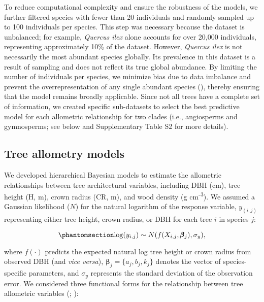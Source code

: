 \documentclass[
  12pt,
  letterpaper,
  DIV=11,
  numbers=noendperiod]{scrartcl}
\begin{document}
To reduce computational complexity and ensure the robustness of the
models, we further filtered species with fewer than 20 individuals and
randomly sampled up to 100 individuals per species. This step was
necessary because the dataset is unbalanced; for example, \emph{Quercus
ilex} alone accounts for over 20,000 individuals, representing
approximately 10\% of the dataset. However, \emph{Quercus ilex} is not
necessarily the most abundant species globally. Its prevalence in this
dataset is a result of sampling and does not reflect its true global
abundance. By limiting the number of individuals per species, we
minimize bias due to data imbalance and prevent the overrepresentation
of any single abundant species (), thereby ensuring that the model remains broadly applicable.
Since not all trees have a complete set of information, we created
specific sub-datasets to select the best predictive model for each
allometric relationship for two clades (i.e., angiosperms and
gymnosperms; see below and Supplementary Table S2 for more details).

\subsection{Tree allometry models}\label{tree-allometry-models}

We developed hierarchical Bayesian models to estimate the allometric
relationships between tree architectural variables, including DBH (cm),
tree height (H, m), crown radius (CR, m), and wood density (g
cm\textsuperscript{-3}). We assumed a Gaussian likelihood (\(N\)) for
the natural logarithm of the response variable, \(y_{(i,j)}\)
representing either tree height, crown radius, or DBH for each tree
\(i\) in species \(j\):

\begin{equation}\phantomsection\label{eq-like}{
\log(y_{i,j}) \sim N(f(X_{i,j}, \pmb{\beta}_{j}), \sigma_y),
}\end{equation}

where \(f(\cdot)\) predicts the expected natural log tree height or
crown radius from observed DBH (and \emph{vice versa}),
\(\pmb{\beta}_{j}=\{a_j, b_j, k_j\}\) denotes the vector of
species-specific parameters, and \(\sigma_y\) represents the standard
deviation of the observation error. We considered three functional forms
for the relationship between tree allometric variables
(;
):
\end{document}
